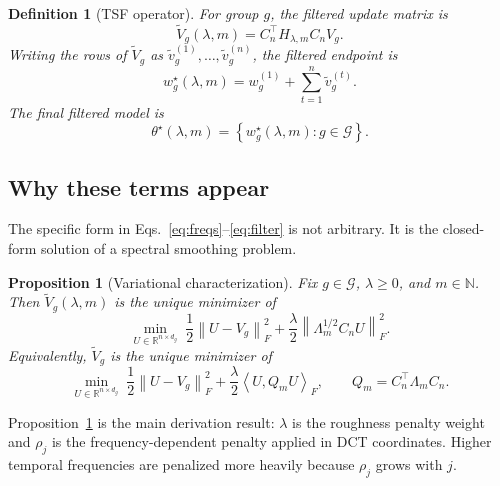 \documentclass{article}
\newtheorem{proposition}{Proposition}
\newtheorem{definition}{Definition}
\newcommand{\RR}{\mathbb{R}}
\newcommand{\cG}{\mathcal{G}}
\newcommand{\tsf}{\textup{\textsc{TSF}}}
\newcommand{\norm}[1]{\left\lVert #1 \right\rVert}
\newcommand{\braces}[1]{\left\{ #1 \right\}}
\newcommand{\inner}[2]{\left\langle #1, #2 \right\rangle}
\begin{document}
\begin{definition}[\tsf{} operator]
For group \(g\), the filtered update matrix is
\begin{equation}
\widetilde V_g(\lambda,m)
=
C_n^\top H_{\lambda,m} C_n V_g.
\label{eq:tsf_updates}
\end{equation}
Writing the rows of \(\widetilde V_g\) as \(\widetilde v_g^{(1)},\ldots,\widetilde v_g^{(n)}\), the filtered endpoint is
\begin{equation}
w_g^\star(\lambda,m)
=
w_g^{(1)} + \sum_{t=1}^{n} \widetilde v_g^{(t)}.
\label{eq:tsf_endpoint}
\end{equation}
The final filtered model is
\begin{equation}
\theta^\star(\lambda,m) = \braces{w_g^\star(\lambda,m) : g\in\cG }.
\label{eq:tsf_model}
\end{equation}
\end{definition}

\subsection{Why these terms appear}

The specific form in Eqs.~\eqref{eq:freqs}--\eqref{eq:filter} is not arbitrary. It is the closed-form solution of a spectral smoothing problem.

\begin{proposition}[Variational characterization]
\label{prop:variational}
Fix \(g\in\cG\), \(\lambda\ge 0\), and \(m\in\mathbb{N}\). Then \(\widetilde V_g(\lambda,m)\) is the unique minimizer of
\begin{equation}
\min_{U\in\RR^{n\times d_g}}
\;
\frac12 \norm{U - V_g}_F^2
+
\frac{\lambda}{2}
\norm{\Lambda_m^{1/2} C_n U}_F^2.
\label{eq:variational}
\end{equation}
Equivalently, \(\widetilde V_g\) is the unique minimizer of
\begin{equation}
\min_{U\in\RR^{n\times d_g}}
\;
\frac12 \norm{U - V_g}_F^2
+
\frac{\lambda}{2}
\inner{U}{Q_m U}_F,
\qquad
Q_m = C_n^\top \Lambda_m C_n.
\label{eq:variational_q}
\end{equation}
\end{proposition}

Proposition~\ref{prop:variational} is the main derivation result: \(\lambda\) is the roughness penalty weight and \(\rho_j\) is the frequency-dependent penalty applied in DCT coordinates. Higher temporal frequencies are penalized more heavily because \(\rho_j\) grows with \(j\).
\end{document}
